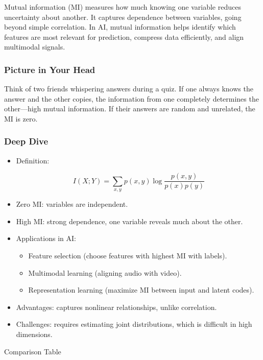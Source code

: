 \documentclass[
  letterpaper,
  DIV=11,
  numbers=noendperiod]{scrreprt}
\providecommand{\tightlist}{%
  \setlength{\itemsep}{0pt}\setlength{\parskip}{0pt}}
\begin{document}
Mutual information (MI) measures how much knowing one variable reduces
uncertainty about another. It captures dependence between variables,
going beyond simple correlation. In AI, mutual information helps
identify which features are most relevant for prediction, compress data
efficiently, and align multimodal signals.

\subsubsection{Picture in Your Head}\label{picture-in-your-head-24}

Think of two friends whispering answers during a quiz. If one always
knows the answer and the other copies, the information from one
completely determines the other---high mutual information. If their
answers are random and unrelated, the MI is zero.

\subsubsection{Deep Dive}\label{deep-dive-24}

\begin{itemize}
\item
  Definition:

  \[
  I(X;Y) = \sum_{x,y} p(x,y) \log \frac{p(x,y)}{p(x)p(y)}
  \]
\item
  Zero MI: variables are independent.
\item
  High MI: strong dependence, one variable reveals much about the other.
\item
  Applications in AI:

  \begin{itemize}
  \tightlist
  \item
    Feature selection (choose features with highest MI with labels).
  \item
    Multimodal learning (aligning audio with video).
  \item
    Representation learning (maximize MI between input and latent
    codes).
  \end{itemize}
\item
  Advantages: captures nonlinear relationships, unlike correlation.
\item
  Challenges: requires estimating joint distributions, which is
  difficult in high dimensions.
\end{itemize}

Comparison Table
\end{document}
